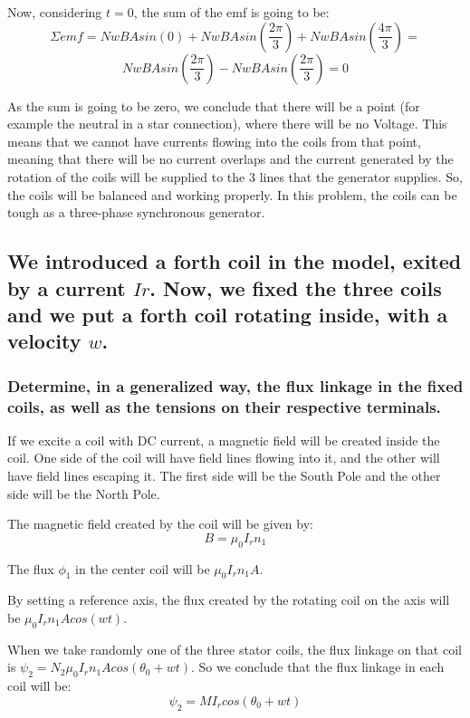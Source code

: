 \documentclass[a4paper,12pt]{article}
\begin{document}
Now, considering $t = 0$, the sum of the emf is going to be:
$$\Sigma emf = NwBAsin(0) + NwBAsin(\frac{2 \pi}{3}) + NwBAsin(\frac{4 \pi}{3}) = $$
$$NwBAsin(\frac{2 \pi}{3}) - NwBAsin(\frac{2 \pi}{3}) = 0$$

As the sum is going to be zero, we conclude that there will be a point (for example the neutral in a star connection), where there will be no Voltage. This means that we cannot have currents flowing into the coils from that point, meaning that there will be no current overlaps and the current generated by the rotation of the coils will be supplied to the 3 lines that the generator supplies. So, the coils will be balanced and working properly.
In this problem, the coils can be tough as a three-phase synchronous generator. 




\subsection{We introduced a forth coil in the model, exited by a current $Ir$. Now, we fixed the three coils and we put a forth coil rotating inside, with a velocity $w$.}



\subsubsection{Determine, in a generalized way, the flux linkage in the fixed coils, as well as the tensions on their respective terminals.}
\hspace{1cm} If we excite a coil with DC current, a magnetic field will be created inside the coil. One side of the coil will have field lines flowing into it, and the other will have field lines escaping it. The first side will be the South Pole and the other side will be the North Pole. 

The magnetic field created by the coil will be given by:
$$B = \mu_0 I_r n_1$$

The flux $\phi_1$ in the center coil will be $\mu_0 I_r n_1  A$.

By setting a reference axis, the flux created by the rotating coil on the axis will be $\mu_0 I_r n_1  A cos(wt)$.

When we take randomly one of the three stator coils, the flux linkage on that coil is $\psi_2 = N_2\mu_0 I_r n_1  A cos(\theta_0 + wt)$. So we conclude that the flux linkage in each coil will be:
\begin{equation}
\psi_2 = MI_rcos(\theta_0 + wt)
\end{equation}
\end{document}
